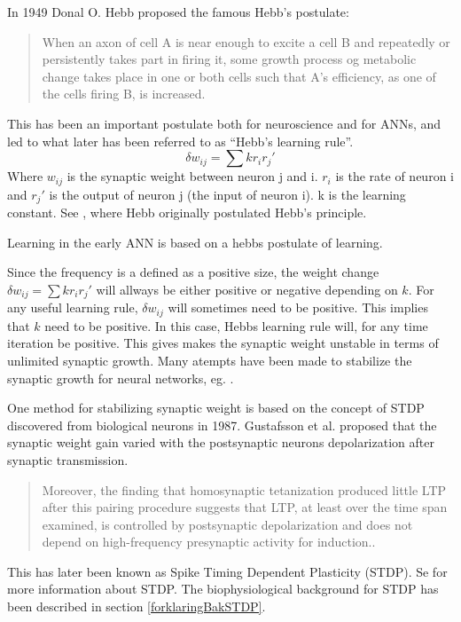 In 1949 Donal O. Hebb proposed the famous Hebb's postulate:
\begin{quote}
When an axon of cell A is near enough to excite a cell B and repeatedly or persistently takes part in firing it, some growth process og metabolic change takes place in one or both cells such that A's efficiency, as one of the cells firing B, is increased.\cite{Hebb1949Kap4}
\end{quote}

This has been an important postulate both for neuroscience and for ANNs, and led to what later has been referred to as ``Hebb's learning rule''.
\begin{equation}
	\delta w_{ij} = \sum{k r_i r_j'}
\end{equation}
Where $w_{ij}$ is the synaptic weight between neuron j and i. $r_i$ is the rate of neuron i and $r_j'$ is the output of neuron j (the input of neuron i). \mbox{k} is the learning constant. See \cite{Hebb1949Kap4}, where Hebb originally postulated Hebb's principle.

Learning in the early ANN is based on a hebbs postulate of learning. %

Since the frequency is a defined as a positive size, the weight change $\delta w_{ij} = \sum{k r_i r_j'}$ will allways be either positive or negative depending on $k$. 
For any useful learning rule, $\delta w_{ij}$ will sometimes need to be positive. This implies that $k$ need to be positive. In this case, Hebbs learning rule will, for any time iteration be positive. 
This gives makes the synaptic weight unstable in terms of unlimited synaptic growth. Many atempts have been made to stabilize the synaptic growth for neural networks, eg. \cite{hebbUstabilt}.

One method for stabilizing synaptic weight is based on the concept of STDP discovered from biological neurons in 1987.
Gustafsson et al. proposed that the synaptic weight gain varied with the postsynaptic neurons depolarization after synaptic transmission\cite{Gustafsson03011987}. 
\begin{quote}
Moreover, the finding that homosynaptic tetanization produced little LTP after this pairing procedure suggests that LTP, at least over the time span examined, is controlled by postsynaptic depolarization and does not depend on high-frequency presynaptic activity for induction.\cite{Gustafsson03011987}.
\end{quote}
This has later been known as Spike Timing Dependent Plasticity (STDP). Se \cite{reviewSTDP} for more information about STDP. The biophysiological background for STDP has been described in section \ref{forklaringBakSTDP}.

